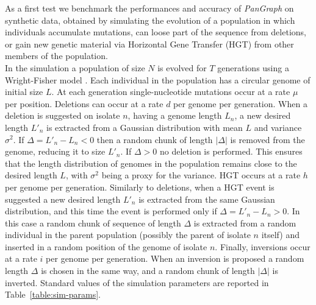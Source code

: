 \documentclass[aps,rmp,reprint,superscriptaddress,notitlepage,10pt,onecolumn]{revtex4-1}
\begin{document}
As a first test we benchmark the performances and accuracy of \textit{PanGraph} on synthetic data, obtained by simulating the evolution of a population in which individuals accumulate mutations, can loose part of the sequence from deletions, or gain new genetic material via Horizontal Gene Transfer (HGT) from other members of the population.\\
In the simulation a population of size $N$ is evolved for $T$ generations using a Wright-Fisher model \cite{hudson2002generating}. Each individual in the population has a circular genome of initial size $L$. At each generation single-nucleotide mutations occur at a rate $\mu$ per position. Deletions can occur at a rate $d$ per genome per generation. When a deletion is suggested on isolate $n$, having a genome length $L_n$, a new desired length $L'_n$ is extracted from a Gaussian distribution with mean $L$ and variance $\sigma^2$. If $\Delta = L'_n - L_n < 0$ then a random chunk of length $|\Delta|$ is removed from the genome, reducing it to size $L'_n$. If $\Delta > 0$ no deletion is performed. This ensures that the length distribution of genomes in the population remains close to the desired length $L$, with $\sigma^2$ being a proxy for the variance.
HGT occurs at a rate $h$ per genome per generation. Similarly to deletions, when a HGT event is suggested a new desired length $L'_n$ is extracted from the same Gaussian distribution, and this time the event is performed only if $\Delta = L'_n - L_n > 0$. In this case a random chunk of sequence of length $\Delta$ is extracted from a random individual in the parent population (possibly the parent of isolate $n$ itself) and inserted in a random position of the genome of isolate $n$.
Finally, inversions occur at a rate $i$ per genome per generation. When an inversion is proposed a random length $\Delta$ is chosen in the same way, and a random chunk of length $|\Delta|$ is inverted.
Standard values of the simulation parameters are reported in Table~\ref{table:sim-params}.
\end{document}
